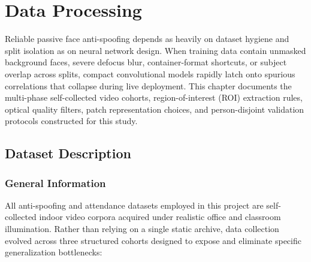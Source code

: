 \chapter{Data Processing}
\label{chap:data_processing}

Reliable passive face anti-spoofing depends as heavily on dataset hygiene and split isolation as on neural network design. When training data contain unmasked background faces, severe defocus blur, container-format shortcuts, or subject overlap across splits, compact convolutional models rapidly latch onto spurious correlations that collapse during live deployment. This chapter documents the multi-phase self-collected video cohorts, region-of-interest (ROI) extraction rules, optical quality filters, patch representation choices, and person-disjoint validation protocols constructed for this study.

\section{Dataset Description}
\label{sec:dataset_description}

\subsection{General Information}
\label{subsec:dataset_general}

All anti-spoofing and attendance datasets employed in this project are self-collected indoor video corpora acquired under realistic office and classroom illumination. Rather than relying on a single static archive, data collection evolved across three structured cohorts designed to expose and eliminate specific generalization bottlenecks:

